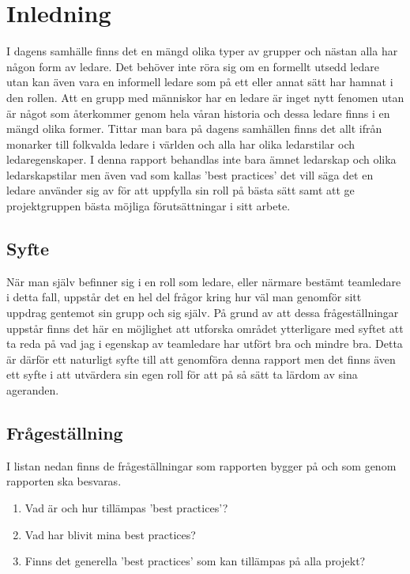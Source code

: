\section{Inledning}
I dagens samhälle finns det en mängd olika typer av grupper och nästan alla har någon form av ledare. Det behöver inte röra sig om en formellt utsedd ledare utan kan även vara en informell ledare som på ett eller annat sätt har hamnat i den rollen. Att en grupp med människor har en ledare är inget nytt fenomen utan är något som återkommer genom hela våran historia och dessa ledare finns i en mängd olika former. Tittar man bara på dagens samhällen finns det allt ifrån monarker till folkvalda ledare i världen och alla har olika ledarstilar och ledaregenskaper. I denna rapport behandlas inte bara ämnet ledarskap och olika ledarskapstilar men även vad som kallas 'best practices' det vill säga det en ledare använder sig av för att uppfylla sin roll på bästa sätt samt att ge projektgruppen bästa möjliga förutsättningar i sitt arbete. 

\subsection{Syfte}
När man själv befinner sig i en roll som ledare, eller närmare bestämt teamledare i detta fall, uppstår det en hel del frågor kring hur väl man genomför sitt uppdrag gentemot sin grupp och sig själv. På grund av att dessa frågeställningar uppstår finns det här en möjlighet att utforska området ytterligare med syftet att ta reda på vad jag i egenskap av teamledare har utfört bra och mindre bra. Detta är därför ett naturligt syfte till att genomföra denna rapport men det finns även ett syfte i att utvärdera sin egen roll för att på så sätt ta lärdom av sina ageranden.

\subsection{Frågeställning}
I listan nedan finns de frågeställningar som rapporten bygger på och som genom rapporten ska besvaras.
	\begin{enumerate}
		\item Vad är och hur tillämpas 'best practices'?
		\item Vad har blivit mina best practices?
		\item Finns det generella 'best practices' som kan tillämpas på alla projekt?
	\end{enumerate}


